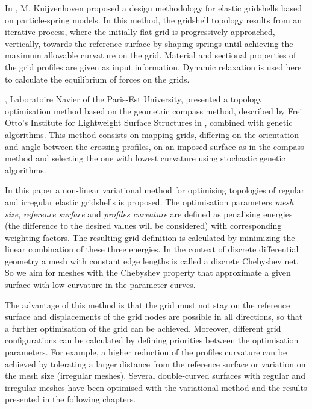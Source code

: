 \documentclass[Thesis.tex]{subfiles}
\begin{document}
In \cite{Kuijvenhoven2009}, M. Kuijvenhoven proposed a design methodology for elastic gridshells based on particle-spring models. In this method, the gridshell topology results from an iterative process, where the initially flat grid is progressively approached, vertically, towards the reference surface by shaping springs until achieving the maximum allowable curvature on the grid. Material and sectional properties of the grid profiles are given as input information. Dynamic relaxation is used here to calculate the equilibrium of forces on the grids. 

\cite{BouhayaBC2011}, Laboratoire Navier of the Paris-Est University, presented a topology optimisation method based on the geometric compass method, described by Frei Otto's Institute for Lightweight Surface Structures in \cite{IL1974}, combined with genetic algorithms. This method consists on mapping grids, differing on the orientation and angle between the crossing profiles, on an imposed surface as in the compass method and selecting the one with lowest curvature using stochastic genetic algorithms.

In this paper a non-linear variational method for optimising topologies of regular and irregular elastic gridshells is proposed. The optimisation parameters {\it mesh size}, {\it reference surface} and {\it profiles curvature} are defined as penalising energies (the difference to the desired values will be considered) with corresponding weighting factors. The resulting grid definition is calculated by minimizing the linear combination of these three energies. In the context of discrete differential geometry a mesh with constant edge lengths is called a discrete Chebyshev net. So we aim for meshes with the Chebyshev property that approximate a given surface with low curvature in the parameter curves. 

The advantage of this method is that the grid must not stay on the reference surface and displacements of the grid nodes are possible in all directions, so that a further optimisation of the grid can be achieved. Moreover, different grid configurations can be calculated by defining priorities between the optimisation parameters. For example, a higher reduction of the profiles curvature can be achieved by tolerating a larger distance from the reference surface or variation on the mesh size (irregular meshes). Several double-curved surfaces with regular and irregular meshes have been optimised with the variational method and the results presented in the following chapters.
\end{document}
